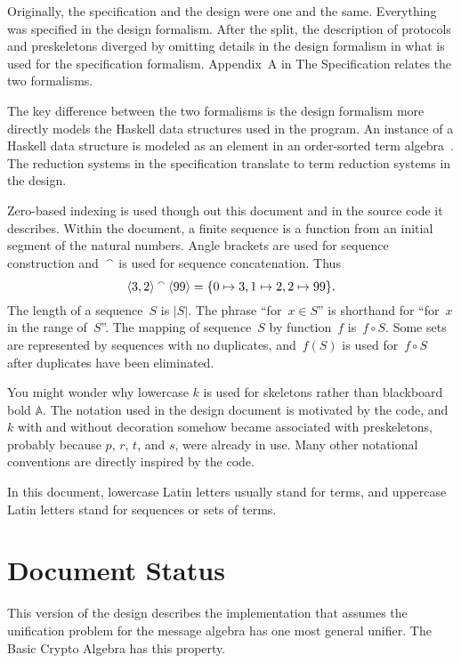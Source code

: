 \documentclass[12pt]{report}
\theoremstyle{definition}
\begin{document}
Originally, the specification and the design were one and the same.
Everything was specified in the design formalism.  After the split,
the description of protocols and preskeletons diverged by omitting
details in the design formalism in what is used for the specification
formalism.  Appendix~A in The {\cpsa} Specification relates the two
formalisms.

The key difference between the two formalisms is the design formalism
more directly models the Haskell data structures used in the {\cpsa}
program.  An instance of a Haskell data structure is modeled as an
element in an order-sorted term algebra~\cite{GoguenMeseguer92}.  The
reduction systems in the specification translate to term reduction
systems in the design.

Zero-based indexing is used though out this document and in the source code
it describes.  Within the document, a finite sequence is a function
from an initial segment of the natural numbers.  Angle brackets are
used for sequence construction and~$\mathbin{{}^\smallfrown}$ is used for sequence
concatenation.  Thus $$\langle3,2\rangle\mathbin{{}^\smallfrown}\langle99\rangle = \{0\mapsto 3,
1\mapsto 2, 2\mapsto 99\}.$$ The length of a sequence~$S$ is $|S|$.
The phrase ``for~$x\in S$'' is shorthand for ``for~$x$ in the range
of~$S$''.  The mapping of sequence~$S$ by function~$f$ is~$f\circ S$.
Some sets are represented by sequences with no duplicates, and~$f(S)$
is used for~$f\circ S$ after duplicates have been eliminated.

You might wonder why lowercase $k$ is used for skeletons rather than
blackboard bold $\mathbb{A}$.  The notation used in the design
document is motivated by the code, and~$k$ with and without decoration
somehow became associated with preskeletons, probably because $p$,
$r$, $t$, and $s$, were already in use.  Many other notational
conventions are directly inspired by the code.

In this document, lowercase Latin letters usually stand for terms, and
uppercase Latin letters stand for sequences or sets of terms.

\section{Document Status}

This version of the design describes the {\cpsa} implementation that
assumes the unification problem for the message algebra has one most
general unifier.  The Basic Crypto Algebra has this property.
\end{document}
